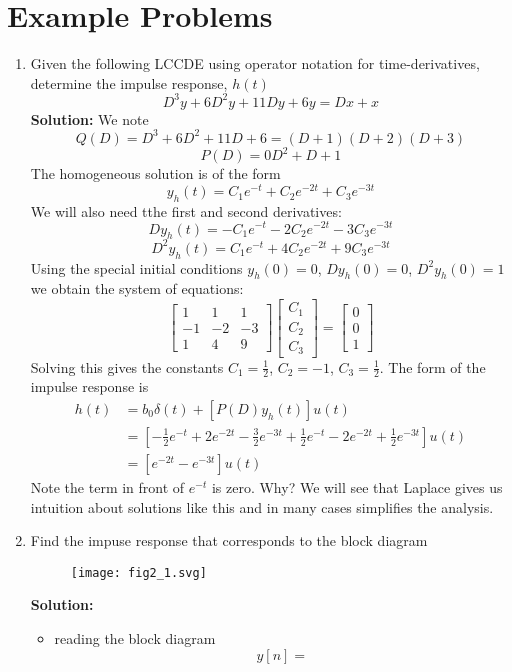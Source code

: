 \documentclass{article}
\begin{document}
\section{Example Problems}

\begin{enumerate}
\item Given the following LCCDE using operator notation for time-derivatives, determine the impulse response, $h(t)$
  \begin{equation}
    D^3y + 6D^2y + 11Dy + 6y = Dx + x
  \end{equation}
  \textbf{Solution:} We note
  \[
  Q(D) = D^3 + 6D^2 + 11D + 6 = (D+1)(D+2)(D+3)
  \]
  \[
  P(D) = 0D^2 + D + 1
  \]
  The homogeneous solution is of the form
  \[
  y_h(t) = C_1e^{-t} + C_2e^{-2t} + C_3e^{-3t} 
  \]
  We will also need tthe first and second derivatives:
  \[
  D y_h(t) = -C_1e^{-t} -2 C_2e^{-2t} -3 C_3e^{-3t} 
  \]
  \[
  D^2 y_h(t) = C_1e^{-t} +4C_2e^{-2t} +9 C_3e^{-3t} 
  \]
  Using the special initial conditions $y_h(0) = 0$, $D y_h(0) = 0$, $D^2 y_h(0) = 1$ we obtain the system of equations:
  \[
  \begin{bmatrix}
    1 & 1 & 1\\
    -1 & -2 & -3\\
    1 & 4 & 9
  \end{bmatrix}
  \begin{bmatrix}
    C_1 \\ C_2 \\ C_3
  \end{bmatrix}
  =
  \begin{bmatrix}
    0 \\ 0 \\ 1
  \end{bmatrix}
  \]
  Solving this gives the constants $C_1 = \frac{1}{2}$, $C_2 = -1$, $C_3 = \frac{1}{2}$. The form of the impulse response is
  \begin{align}
    h(t) &= b_0\delta(t) + \left[ P(D) y_h(t) \right] u(t)\\
      &= \left[-\frac{1}{2} e^{-t} + 2e^{-2t} - \frac{3}{2}e^{-3t} + \frac{1}{2}e^{-t} - 2e^{-2t} + \frac{1}{2}e^{-3t} \right] u(t)\\
        &= \left[e^{-2t} - e^{-3t}\right] u(t)
  \end{align}
  Note the term in front of $e^{-t}$ is zero. Why? We will see that Laplace gives us intuition about solutions like this and in many cases simplifies the analysis.
  
\item Find the impuse response that corresponds to the block diagram

  \begin{figure}
    \centering
    \texttt{[image: fig2\_1.svg]}
  \end{figure}
  \textbf{Solution:}
  \begin{itemize}
  \item reading the block diagram
    \[
    y[n] = 
    \]
  \end{itemize}

\end{enumerate}
\end{document}
